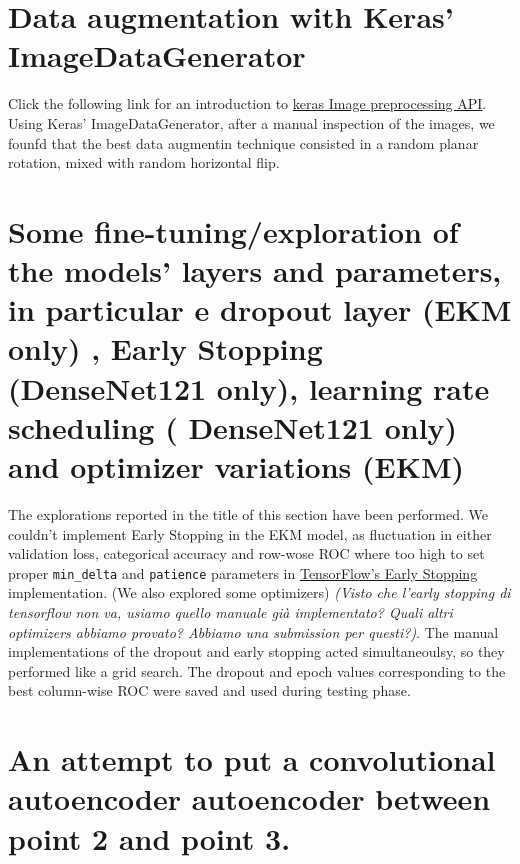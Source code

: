 \documentclass[12pt,halfline,a4paper,]{ouparticle}
\begin{document}
\hypertarget{data-augmentation-with-keras-imagedatagenerator}{%
\section{Data augmentation with Keras'
ImageDataGenerator}\label{data-augmentation-with-keras-imagedatagenerator}}

Click the following link for an introduction to
\href{https://keras.io/api/preprocessing/image/}{keras Image
preprocessing API}. Using Keras' ImageDataGenerator, after a manual
inspection of the images, we founfd that the best data augmentin
technique consisted in a random planar rotation, mixed with random
horizontal flip.

\hypertarget{some-fine-tuningexploration-of-the-models-layers-and-parameters-in-particular-e-dropout-layer-ekm-only-early-stopping-densenet121-only-learning-rate-scheduling-densenet121-only-and-optimizer-variations-ekm}{%
\section{Some fine-tuning/exploration of the models' layers and
parameters, in particular e dropout layer (EKM only) , Early Stopping
(DenseNet121 only), learning rate scheduling ( DenseNet121 only) and
optimizer variations
(EKM)}\label{some-fine-tuningexploration-of-the-models-layers-and-parameters-in-particular-e-dropout-layer-ekm-only-early-stopping-densenet121-only-learning-rate-scheduling-densenet121-only-and-optimizer-variations-ekm}}

The explorations reported in the title of this section have been
performed. We couldn't implement Early Stopping in the EKM model, as
fluctuation in either validation loss, categorical accuracy and row-wose
ROC where too high to set proper \texttt{min\_delta} and
\texttt{patience} parameters in
\href{https://www.tensorflow.org/api_docs/python/tf/keras/callbacks/EarlyStopping}{TensorFlow's
Early Stopping} implementation. (We also explored some optimizers)
\emph{(Visto che l'early stopping di tensorflow non va, usiamo quello
manuale già implementato? Quali altri optimizers abbiamo provato?
Abbiamo una submission per questi?)}. The manual implementations of the
dropout and early stopping acted simultaneoulsy, so they performed like
a grid search. The dropout and epoch values corresponding to the best
column-wise ROC were saved and used during testing phase.

\hypertarget{an-attempt-to-put-a-convolutional-autoencoder-autoencoder-between-point-2-and-point-3.}{%
\section{An attempt to put a convolutional autoencoder autoencoder
between point 2 and point
3.}\label{an-attempt-to-put-a-convolutional-autoencoder-autoencoder-between-point-2-and-point-3.}}
\end{document}
